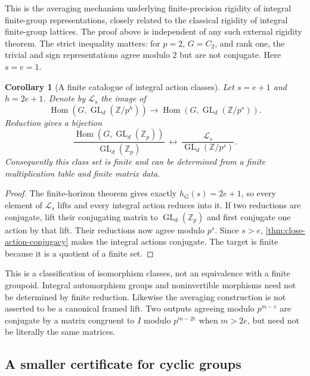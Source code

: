 \documentclass[11pt]{article}
\newtheorem{corollary}[theorem]{Corollary}
\theoremstyle{definition}
\theoremstyle{remark}
\begin{document}
This is the averaging mechanism underlying finite-precision rigidity of integral finite-group representations, closely related to the classical rigidity of integral finite-group lattices. The proof above is independent of any such external rigidity theorem. The strict inequality matters: for $p=2$, $G=C_2$, and rank one, the trivial and sign representations agree modulo $2$ but are not conjugate. Here $s=e=1$.

\begin{corollary}[A finite catalogue of integral action classes]\label{cor:finite-action-catalogue}
Let $s=e+1$ and $h=2e+1$. Denote by $\mathscr L_s$ the image of
\[
 \operatorname{Hom}(G,\operatorname{GL}_d(\mathbb Z/p^h))
 \longrightarrow
 \operatorname{Hom}(G,\operatorname{GL}_d(\mathbb Z/p^s)).
\]
Reduction gives a bijection
\[
 \boxed{
 \frac{\operatorname{Hom}(G,\operatorname{GL}_d(\mathbb Z_p))}
 {\operatorname{GL}_d(\mathbb Z_p)}
 \ \longleftrightarrow\
 \frac{\mathscr L_s}{\operatorname{GL}_d(\mathbb Z/p^s)}.}
\]
Consequently this class set is finite and can be determined from a finite multiplication table and finite matrix data.
\end{corollary}
\begin{proof}
The finite-horizon theorem gives exactly $h_G(s)=2e+1$, so every element of $\mathscr L_s$ lifts and every integral action reduces into it. If two reductions are conjugate, lift their conjugating matrix to $\operatorname{GL}_d(\mathbb Z_p)$ and first conjugate one action by that lift. Their reductions now agree modulo $p^s$. Since $s>e$, \cref{thm:close-action-conjugacy} makes the integral actions conjugate. The target is finite because it is a quotient of a finite set.
\end{proof}

This is a classification of isomorphism classes, not an equivalence with a finite groupoid. Integral automorphism groups and noninvertible morphisms need not be determined by finite reduction. Likewise the averaging construction is not asserted to be a canonical framed lift. Two outputs agreeing modulo $p^{m-e}$ are conjugate by a matrix congruent to $I$ modulo $p^{m-2e}$ when $m>2e$, but need not be literally the same matrices.

\subsection{A smaller certificate for cyclic groups}
\end{document}
